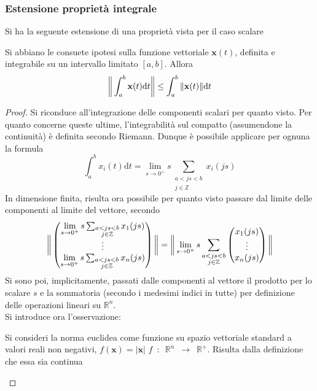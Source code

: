\documentclass[10pt, oneside]{book}
\theoremstyle{plain}
\begin{document}
\subsubsection{Estensione proprietà integrale}
Si ha la seguente estensione di una proprietà vista per il caso scalare
\begin{prop}
Si abbiano le consuete ipotesi sulla funzione vettoriale $\mathbf{x}(t)$, definita e integrabile su un intervallo limitato $[a,b]$. Allora
\[\bigg{\|}\int_{a}^{b}\mathbf{x}(t)\textrm{d}t\bigg{\|} \leq \int_{a}^{b}\|\mathbf{x}(t)\|\textrm{d}t\]
\end{prop}
\begin{proof}
Si riconduce all'integrazione delle componenti scalari per quanto visto. Per quanto concerne queste ultime, l'integrabilità sul compatto (assumendone la continuità) è definita secondo Riemann. Dunque è possibile applicare per ognuna la formula
\[\int_{a}^{b}x_i(t)\textrm{d}t = \lim\limits_{s \rightarrow 0^+}s \sum_{\displaystyle \substack{a < js < b \\ j \in \mathbb{Z}}} x_i(js)\]
In dimensione finita, risulta ora possibile per quanto visto passare dal limite delle componenti al limite del vettore, secondo 
\[\bigg{\|}\begin{pmatrix}
\lim\limits_{s \rightarrow 0^+}s \sum_{\substack{a < js < b \\ j \in \mathbb{Z}}} x_1(js) \\
\vdots \\
\lim\limits_{s \rightarrow 0^+}s \sum_{\substack{a < js < b \\ j \in \mathbb{Z}}} x_n(js)
\end{pmatrix}\bigg{\|} = \bigg{\|}\lim\limits_{s \rightarrow 0^+}s \sum_{\displaystyle \substack{a < js < b \\ j \in \mathbb{Z}}} \begin{pmatrix}
x_1(js)\\
\vdots\\
x_n(js)
\end{pmatrix}\bigg{\|}\]
Si sono poi, implicitamente, passati dalle componenti al vettore il prodotto per lo scalare $s$ e la sommatoria (secondo i medesimi indici in tutte) per definizione delle operazioni lineari su $\mathbb{R}^n$.
\\Si introduce ora l'osservazione:
\begin{oss}
Si consideri la norma euclidea come funzione su spazio vettoriale standard a valori reali non negativi, $f(\mathbf{x}) = |\mathbf{x}|$ $f \enspace : \enspace \mathbb{R}^n \enspace \rightarrow \enspace \mathbb{R}^+$. Risulta dalla definizione che essa sia continua

\end{oss}
\end{proof}
\end{document}
